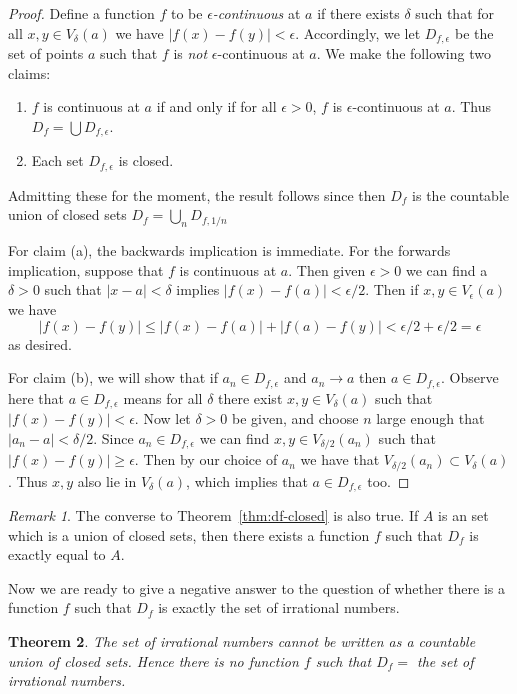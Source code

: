 \documentclass[11pt,oneside]{amsbook}
\theoremstyle{definition}
\theoremstyle{plain}
\newtheorem{thm}{Theorem}[section]
\theoremstyle{definition}
\theoremstyle{remark}
\newtheorem{rem}[thm]{Remark}
\numberwithin{equation}{section}
\numberwithin{figure}{section}
\begin{document}
\begin{proof}
  Define a function $f$ to be \emph{$\epsilon$-continuous} at $a$ if there exists $\delta$ such that for all $x,y\in V_\delta(a)$ we have $|f(x)-f(y)|<\epsilon$. Accordingly, we let $D_{f,\epsilon}$ be the set of points $a$ such that $f$ is \emph{not} $\epsilon$-continuous at $a$. We make the following two claims:
  \begin{enumerate}
  \item $f$ is continuous at $a$ if and only if for all $\epsilon>0$, $f$ is $\epsilon$-continuous at $a$. Thus $D_f=\bigcup D_{f,\epsilon}$.
  \item Each set $D_{f,\epsilon}$ is closed.
  \end{enumerate}
  Admitting these for the moment, the result follows since then $D_f$ is the countable union of closed sets $D_f=\bigcup_nD_{f,1/n}$

  For claim (a), the backwards implication is immediate. For the forwards implication, suppose that $f$ is continuous at $a$. Then given $\epsilon>0$ we can find a $\delta>0$ such that $|x-a|<\delta$ implies $|f(x)-f(a)|<\epsilon/2$. Then if $x,y\in V_\epsilon(a)$ we have
  \[|f(x)-f(y)|\leq|f(x)-f(a)|+|f(a)-f(y)|<\epsilon/2+\epsilon/2=\epsilon
  \]
  as desired.

  For claim (b), we will show that if $a_n\in D_{f,\epsilon}$ and $a_n\to a$ then $a\in D_{f,\epsilon}$. Observe here that $a\in D_{f,\epsilon}$ means for all $\delta$ there exist $x,y\in V_\delta(a)$ such that $|f(x)-f(y)|<\epsilon$. Now let $\delta>0$ be given, and choose $n$ large enough that $|a_n-a|<\delta/2$. Since $a_n\in D_{f,\epsilon}$ we can find $x,y\in V_{\delta/2}(a_n)$ such that $|f(x)-f(y)|\geq\epsilon$. Then by our choice of $a_n$ we have that $V_{\delta/2}(a_n)\subset V_\delta(a)$. Thus $x,y$ also lie in $V_\delta(a)$, which implies that $a\in D_{f,\epsilon}$ too.
\end{proof}

\begin{rem}
  The converse to Theorem~\ref{thm:df-closed} is also true. If $A$ is an set which is a union of closed sets, then there exists a function $f$ such that $D_f$ is exactly equal to $A$.
\end{rem}

Now we are ready to give a negative answer to the question of whether there is a function $f$ such that $D_f$ is exactly the set of irrational numbers.

\begin{thm}
  \label{thm:df-irrationals}
  The set of irrational numbers cannot be written as a countable union of closed sets. Hence there is no function $f$ such that $D_f=$ the set of irrational numbers.
\end{thm}
\end{document}
